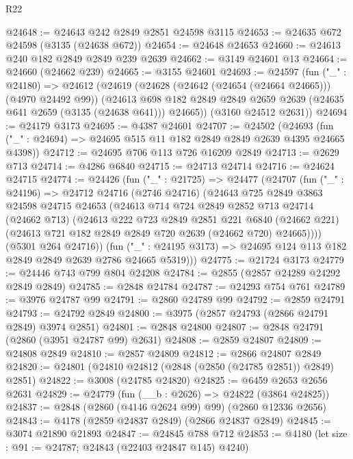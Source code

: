 \begin{lexlean}{R22}
\begin{coremodule}
@24648 := @24643 @242 @2849 @2851 @24598 @3115
@24653 := @24635 @672 @24598 (@3135 (@24638 @672))
@24654 := @24648 @24653
@24660 := @24613 @240 @182 @2849 @2849 @239 @2639
@24662 := @3149 @24601 @13
@24664 := @24660 (@24662 @239)
@24665 := @3155 @24601
@24693 := @24597
    (fun ("_" : @24180) =>
    @24612
      (@24619
        (@24628 (@24642 (@24654 (@24664 @24665))) (@4970 @24492 @99))
        (@24613 @698 @182 @2849 @2849 @2659 @2639 (@24635 @641 @2659 (@3135 (@24638 @641))) @24665))
      (@3160 @24512 @2631))
@24694 := @24179 @3173
@24695 := @4387 @24601
@24707 := @24502
    (@24693 (fun ("_" : @24694) => @24695 @515 @11 @182 @2849 @2849 @2639 @4395 @24665 @4398))
@24712 := @24695 @706 @113 @726 @16209 @2849
@24713 := @2629 @713
@24714 := @4286 @6840
@24715 := @24713 @24714
@24716 := @24624 @24715
@24774 := @24426
    (fun ("_" : @21725) =>
    @24477
      (@24707
        (fun ("_" : @24196) =>
        @24712
          @24716
          (@2746 @24716)
          (@24643
            @725
            @2849
            @3863
            @24598
            @24715
            @24653
            (@24613
              @714
              @724
              @2849
              @2852
              @713
              @24714
              (@24662 @713)
              (@24613
                @222
                @723
                @2849
                @2851
                @221
                @6840
                (@24662 @221)
                (@24613 @721 @182 @2849 @2849 @720 @2639 (@24662 @720) @24665))))
          (@5301 @264 @24716))
        (fun ("_" : @24195 @3173) => @24695 @124 @113 @182 @2849 @2849 @2639 @2786 @24665 @5319)))
@24775 := @21724 @3173
@24779 := @24446 @743 @799 @804 @24208
@24784 := @2855 (@2857 @24289 @24292 @2849 @2849)
@24785 := @2848 @24784
@24787 := @24293 @754 @761
@24789 := @3976 @24787 @99
@24791 := @2860 @24789 @99
@24792 := @2859 @24791
@24793 := @24792 @2849
@24800 := @3975 (@2857 @24793 (@2866 @24791 @2849) @3974 @2851)
@24801 := @2848 @24800
@24807 := @2848 @24791 (@2860 (@3951 @24787 @99) @2631)
@24808 := @2859 @24807
@24809 := @24808 @2849
@24810 := @2857 @24809
@24812 := @2866 @24807 @2849
@24820 := @24801 (@24810 @24812 (@2848 (@2850 (@24785 @2851)) @2849) @2851)
@24822 := @3008 (@24785 @24820)
@24825 := @6459 @2653 @2656 @2631
@24829 := @24779 (fun (__b : @2626) => @24822 (@3864 @24825))
@24837 := @2848 (@2860 (@4146 @2624 @99) @99) (@2860 @12336 @2656)
@24843 := @4178 (@2859 @24837 @2849) (@2866 @24837 @2849)
@24845 := @3074 @21890 @21893
@24847 := @24845 @788 @712
@24853 := @4180 (let size : @91 := @24787; @24843 (@22403 @24847 @145) @4240)

\end{coremodule}
\end{lexlean}
